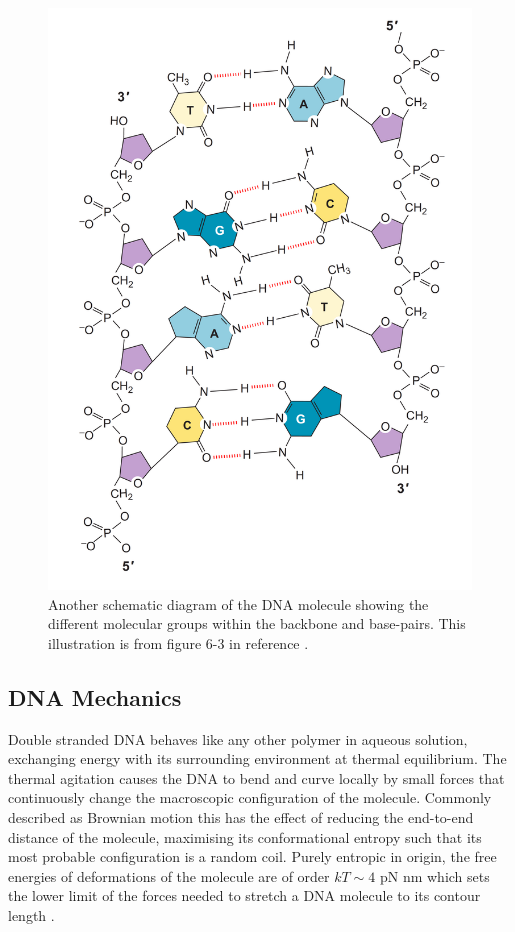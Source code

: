 \begin{figure}[htp]
\centering \includegraphics[scale=0.1]{Graphics/DNA/dna_schematic.pdf}
\caption{Another schematic diagram of the DNA molecule showing the different molecular groups within the backbone and base-pairs. This illustration is from figure 6-3 in reference \cite{Watson2003}.}
\label{fig:dna_schematic}
\end{figure}
%
\subsection{DNA Mechanics}

Double stranded DNA behaves like any other polymer in aqueous solution, exchanging energy with its surrounding environment at thermal equilibrium. The thermal agitation causes the DNA to bend and curve locally by small forces that continuously change the macroscopic configuration of the molecule. Commonly described as Brownian motion this has the effect of reducing the end-to-end distance of the molecule, maximising its conformational entropy such that its most probable configuration is a random coil. Purely entropic in origin, the free energies of deformations of the molecule are of order $kT \sim 4$ pN nm which sets the lower limit of the forces needed to stretch a DNA molecule to its contour length \cite{Harris2004,Strick2003}. 

